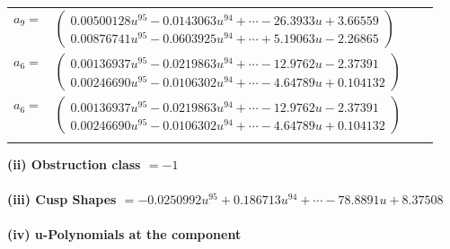 \documentclass[1p]{elsarticle_modified}
\theoremstyle{definition}
\begin{document}
\begin{tabular}{m{7pt} m{180pt} m{7pt} m{180pt} }
\flushright $a_{9}=$&$\begin{pmatrix}0.00500128 u^{95}-0.0143063 u^{94}+\cdots-26.3933 u+3.66559\\0.00876741 u^{95}-0.0603925 u^{94}+\cdots+5.19063 u-2.26865\end{pmatrix}$ \\
\flushright $a_{6}=$&$\begin{pmatrix}0.00136937 u^{95}-0.0219863 u^{94}+\cdots-12.9762 u-2.37391\\0.00246690 u^{95}-0.0106302 u^{94}+\cdots-4.64789 u+0.104132\end{pmatrix}$\\ \flushright $a_{6}=$&$\begin{pmatrix}0.00136937 u^{95}-0.0219863 u^{94}+\cdots-12.9762 u-2.37391\\0.00246690 u^{95}-0.0106302 u^{94}+\cdots-4.64789 u+0.104132\end{pmatrix}$\\&\end{tabular}
\flushleft \textbf{(ii) Obstruction class $= -1$}\\~\\
\flushleft \textbf{(iii) Cusp Shapes $= -0.0250992 u^{95}+0.186713 u^{94}+\cdots-78.8891 u+8.37508$}\\~\\
\newpage\renewcommand{\arraystretch}{1}
\flushleft \textbf{(iv) u-Polynomials at the component}\newline \\
\end{document}
